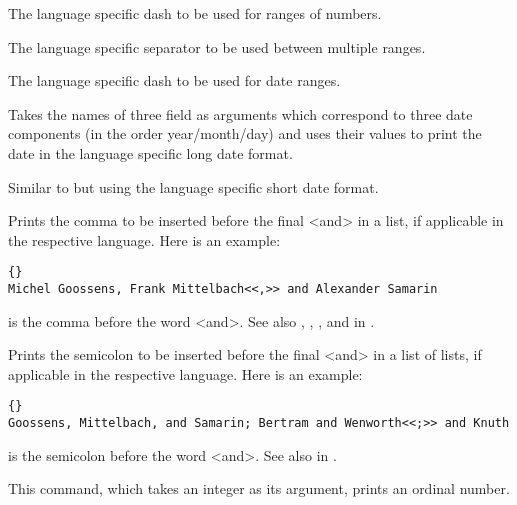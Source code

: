 \documentclass{ltxdockit}[2011/03/25]
\begin{document}
\begin{ltxsyntax}


The language specific dash to be used for ranges of numbers.

\BiberOnlyMark

The language specific separator to be used between multiple ranges.


The language specific dash to be used for date ranges.


Takes the names of three field as arguments which correspond to three date components (in the order year\slash month\slash day) and uses their values to print the date in the language specific long date format.


Similar to  but using the language specific short date format.


Prints the comma to be inserted before the final <and> in a list, if applicable in the respective language. Here is an example:

\begin{lstlisting}[style=latex]{}
Michel Goossens, Frank Mittelbach<<,>> and Alexander Samarin
\end{lstlisting}
%
 is the comma before the word <and>. See also , , , and  in .


Prints the semicolon to be inserted before the final <and> in a list of lists, if applicable in the respective language. Here is an example:

\begin{lstlisting}[style=latex]{}
Goossens, Mittelbach, and Samarin; Bertram and Wenworth<<;>> and Knuth
\end{lstlisting}
%
 is the semicolon before the word <and>. See also  in .


This command, which takes an integer as its argument, prints an ordinal number.



\end{ltxsyntax}
\end{document}
